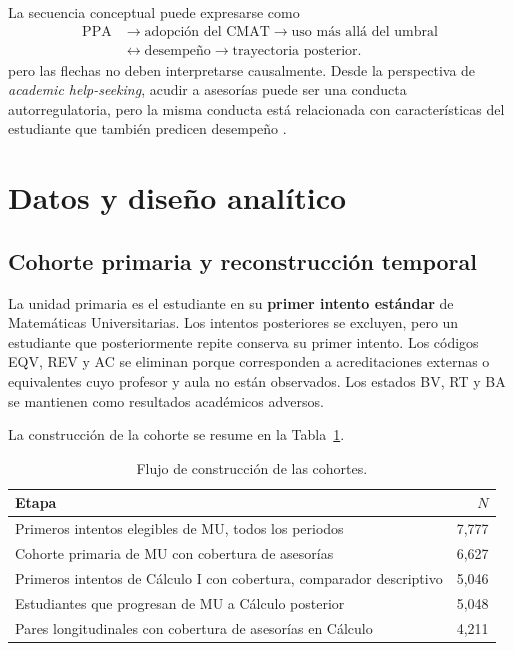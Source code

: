 \documentclass[11pt,letterpaper]{article}
\begin{document}
La secuencia conceptual puede expresarse como
\[
\begin{aligned}
\text{PPA}&\longrightarrow\text{adopción del CMAT}\longrightarrow\text{uso más allá del umbral}\\
&\longleftrightarrow\text{desempeño}\longrightarrow\text{trayectoria posterior}.
\end{aligned}
\]
pero las flechas no deben interpretarse causalmente. Desde la perspectiva de \emph{academic help-seeking}, acudir a asesorías puede ser una conducta autorregulatoria, pero la misma conducta está relacionada con características del estudiante que también predicen desempeño \citep{fong2023}.

\section{Datos y diseño analítico}

\subsection{Cohorte primaria y reconstrucción temporal}

La unidad primaria es el estudiante en su \textbf{primer intento estándar} de Matemáticas Universitarias. Los intentos posteriores se excluyen, pero un estudiante que posteriormente repite conserva su primer intento. Los códigos EQV, REV y AC se eliminan porque corresponden a acreditaciones externas o equivalentes cuyo profesor y aula no están observados. Los estados BV, RT y BA se mantienen como resultados académicos adversos.

La construcción de la cohorte se resume en la Tabla~\ref{tab:cohort}.

\begin{table}[H]
\centering
\caption{Flujo de construcción de las cohortes.}
\label{tab:cohort}
\begin{tabular}{@{}lr@{}}
\toprule
\textbf{Etapa} & \textbf{$N$} \\
\midrule
Primeros intentos elegibles de MU, todos los periodos & 7,777 \\
Cohorte primaria de MU con cobertura de asesorías & 6,627 \\
Primeros intentos de Cálculo I con cobertura, comparador descriptivo & 5,046 \\
Estudiantes que progresan de MU a Cálculo posterior & 5,048 \\
Pares longitudinales con cobertura de asesorías en Cálculo & 4,211 \\
\bottomrule
\end{tabular}
\end{table}
\end{document}
